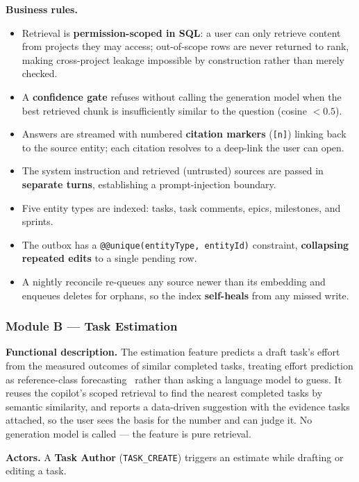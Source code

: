 \textbf{Business rules.}
\begin{itemize}
  \item Retrieval is \textbf{permission-scoped in SQL}: a user can only retrieve content from
    projects they may access; out-of-scope rows are never returned to rank, making
    cross-project leakage impossible by construction rather than merely checked.
  \item A \textbf{confidence gate} refuses without calling the generation model when the best
    retrieved chunk is insufficiently similar to the question (cosine $< 0.5$).
  \item Answers are streamed with numbered \textbf{citation markers} (\texttt{[n]}) linking back
    to the source entity; each citation resolves to a deep-link the user can open.
  \item The system instruction and retrieved (untrusted) sources are passed in
    \textbf{separate turns}, establishing a prompt-injection boundary.
  \item Five entity types are indexed: tasks, task comments, epics, milestones, and sprints.
  \item The outbox has a \texttt{@@unique(entityType, entityId)} constraint, \textbf{collapsing
    repeated edits} to a single pending row.
  \item A nightly reconcile re-queues any source newer than its embedding and enqueues deletes
    for orphans, so the index \textbf{self-heals} from any missed write.
\end{itemize}

\subsubsection{Module B --- Task Estimation}

\textbf{Functional description.} The estimation feature predicts a draft task's effort from the
measured outcomes of similar completed tasks, treating effort prediction as reference-class
forecasting~\cite{kahneman1977reference} rather than asking a language model to guess. It reuses the copilot's
scoped retrieval to find the nearest completed tasks by semantic similarity, and reports a
data-driven suggestion with the evidence tasks attached, so the user sees the basis for the
number and can judge it. No generation model is called --- the feature is pure retrieval.

\textbf{Actors.} A \textbf{Task Author} (\texttt{TASK\_CREATE}) triggers an estimate while
drafting or editing a task.

